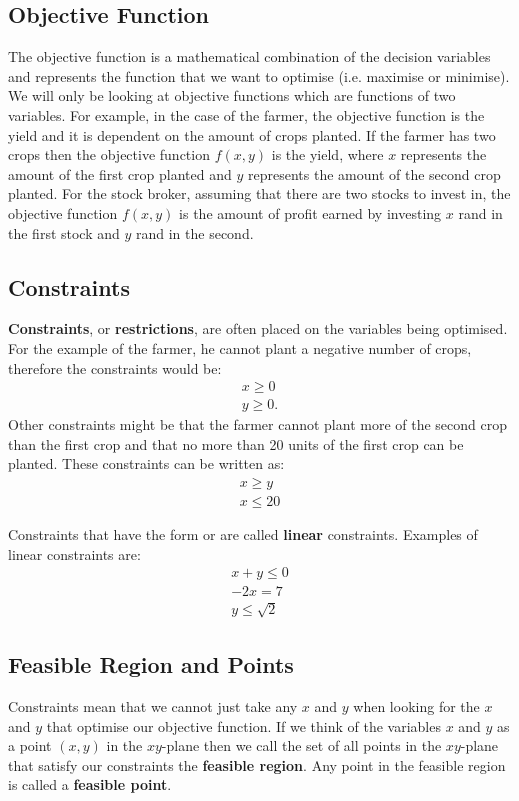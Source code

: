 \subsection{Objective Function}
The objective function is a mathematical combination of the decision variables and represents the function that we want to optimise (i.e.\@{} maximise or minimise). We will only be looking at objective functions which are functions of two variables. For example, in the case of the farmer, the objective function is the yield and it is dependent on the amount of crops planted. If the farmer has two crops then the objective function $f(x,y)$ is the yield, where $x$ represents the amount of the first crop planted and $y$ represents the amount of the second crop planted. For the stock broker, assuming that there are two stocks to invest in, the objective function $f(x,y)$ is the amount of profit earned by investing $x$ rand in the first stock and $y$ rand in the second.

\subsection{Constraints}
\textbf{Constraints}, or \textbf{restrictions}, are often placed on the variables being optimised. For the example of the farmer, he cannot plant a negative number of crops, therefore the constraints would be:
\begin{eqnarray*}
x\geq 0\\
y\geq 0.
\end{eqnarray*}
Other constraints might be that the farmer cannot plant more of the second crop than the first crop and that no more than 20 units of the first crop can be planted. These constraints can be written as:
\begin{eqnarray*}
x\geq y\\
x\leq 20
\end{eqnarray*}

Constraints that have the form
or
are called \textbf{linear} constraints. Examples of linear constraints are:
\begin{eqnarray*}
x+y\leq 0\\
-2x=7\\
y\leq \sqrt{2}
\end{eqnarray*}

\subsection{Feasible Region and Points}
Constraints mean that we cannot just take any $x$ and $y$ when looking for the $x$ and $y$ that optimise our objective function. If we think of the variables $x$ and $y$ as a point $(x,y)$ in the $xy$-plane then we call the set of all points in the $xy$-plane that satisfy our constraints the \textbf{feasible region}. Any point in the feasible region is called a \textbf{feasible point}.

